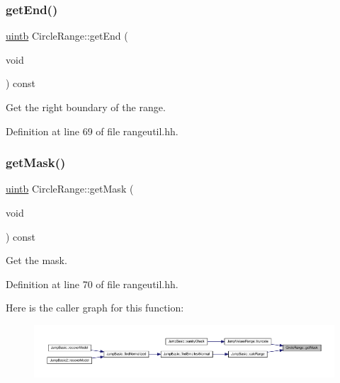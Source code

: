 \subsubsection{\texorpdfstring{getEnd()}{getEnd()}}
{\footnotesize\ttfamily \mbox{\hyperlink{types_8h_a2db313c5d32a12b01d26ac9b3bca178f}{uintb}} Circle\+Range\+::get\+End (\begin{DoxyParamCaption}\item[{void}]{ }\end{DoxyParamCaption}) const\hspace{0.3cm}{\ttfamily [inline]}}



Get the right boundary of the range. 



Definition at line 69 of file rangeutil.\+hh.

\mbox{\label{class_circle_range_ad159c5cf77ea4b8e923471499a6c79ad}} 
\subsubsection{\texorpdfstring{getMask()}{getMask()}}
{\footnotesize\ttfamily \mbox{\hyperlink{types_8h_a2db313c5d32a12b01d26ac9b3bca178f}{uintb}} Circle\+Range\+::get\+Mask (\begin{DoxyParamCaption}\item[{void}]{ }\end{DoxyParamCaption}) const\hspace{0.3cm}{\ttfamily [inline]}}



Get the mask. 



Definition at line 70 of file rangeutil.\+hh.

Here is the caller graph for this function\+:
\nopagebreak
\begin{figure}[H]
\begin{center}
\leavevmode
\includegraphics[width=350pt]{class_circle_range_ad159c5cf77ea4b8e923471499a6c79ad_icgraph}
\end{center}
\end{figure}
\mbox{\label{class_circle_range_ab7d87070d5438997797f5996246715f5}} 
